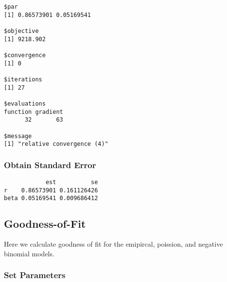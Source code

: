 \documentclass[]{book}
\newenvironment{Shaded}{\begin{snugshade}}{\end{snugshade}}
\newcommand{\KeywordTok}[1]{\textcolor[rgb]{0.13,0.29,0.53}{\textbf{#1}}}
\newcommand{\DecValTok}[1]{\textcolor[rgb]{0.00,0.00,0.81}{#1}}
\newcommand{\StringTok}[1]{\textcolor[rgb]{0.31,0.60,0.02}{#1}}
\newcommand{\OperatorTok}[1]{\textcolor[rgb]{0.81,0.36,0.00}{\textbf{#1}}}
\newcommand{\NormalTok}[1]{#1}
\theoremstyle{definition}
\theoremstyle{definition}
\theoremstyle{definition}
\theoremstyle{remark}
\begin{document}
\begin{verbatim}
$par
[1] 0.86573901 0.05169541

$objective
[1] 9218.902

$convergence
[1] 0

$iterations
[1] 27

$evaluations
function gradient 
      32       63 

$message
[1] "relative convergence (4)"
\end{verbatim}

\subsubsection{Obtain Standard Error}\label{obtain-standard-error-1}

\begin{Shaded}
\end{Shaded}

\begin{verbatim}
            est          se
r    0.86573901 0.161126426
beta 0.05169541 0.009686412
\end{verbatim}

\subsection{Goodness-of-Fit}\label{goodness-of-fit-1}

Here we calculate goodness of fit for the emipircal, poission, and
negative binomial models.

\subsubsection{Set Parameters}\label{set-parameters-1}

\begin{Shaded}
\end{Shaded}
\end{document}
